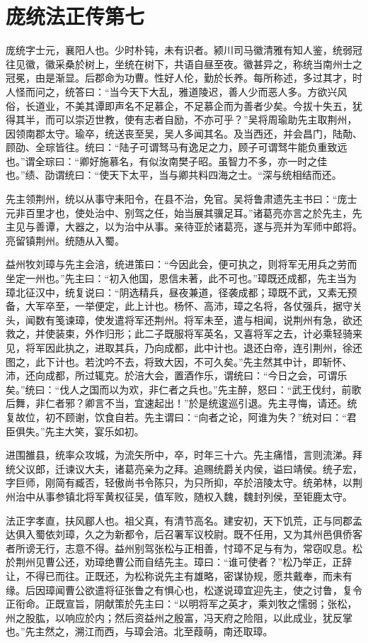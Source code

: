 \documentclass[12pt,UTF8]{ctexbook}
\begin{document}
\chapter{庞统法正传第七}

庞统字士元，襄阳人也。少时朴钝，未有识者。颍川司马徽清雅有知人鉴，统弱冠往见徽，徽采桑於树上，坐统在树下，共语自昼至夜。徽甚异之，称统当南州士之冠冕，由是渐显。后郡命为功曹。性好人伦，勤於长养。每所称述，多过其才，时人怪而问之，统答曰：“当今天下大乱，雅道陵迟，善人少而恶人多。方欲兴风俗，长道业，不美其谭即声名不足慕企，不足慕企而为善者少矣。今拔十失五，犹得其半，而可以崇迈世教，使有志者自励，不亦可乎？”吴将周瑜助先主取荆州，因领南郡太守。瑜卒，统送丧至吴，吴人多闻其名。及当西还，并会昌门，陆勣、顾劭、全琮皆往。统曰：“陆子可谓驽马有逸足之力，顾子可谓驽牛能负重致远也。”谓全琮曰：“卿好施慕名，有似汝南樊子昭。虽智力不多，亦一时之佳也。”绩、劭谓统曰：“使天下太平，当与卿共料四海之士。“深与统相结而还。

先主领荆州，统以从事守耒阳令，在县不治，免官。吴将鲁肃遗先主书曰：“庞士元非百里才也，使处治中、别驾之任，始当展其骥足耳。”诸葛亮亦言之於先主，先主见与善谭，大器之，以为治中从事。亲待亚於诸葛亮，遂与亮并为军师中郎将。亮留镇荆州。统随从入蜀。

益州牧刘璋与先主会涪，统进策曰：“今因此会，便可执之，则将军无用兵之劳而坐定一州也。”先主曰：“初入他国，恩信未著，此不可也。”璋既还成都，先主当为璋北征汉中，统复说曰：“阴选精兵，昼夜兼道，径袭成都；璋既不武，又素无预备，大军卒至，一举便定，此上计也。杨怀、高沛，璋之名将，各仗强兵，据守关头，闻数有笺谏璋，使发遣将军还荆州。将军未至，遣与相闻，说荆州有急，欲还救之，并使装束，外作归形；此二子既服将军英名，又喜将军之去，计必乘轻骑来见，将军因此执之，进取其兵，乃向成都，此中计也。退还白帝，连引荆州，徐还图之，此下计也。若沈吟不去，将致大因，不可久矣。”先主然其中计，即斩怀、沛，还向成都，所过辄克。於涪大会，置酒作乐，谓统曰：“今日之会，可谓乐矣。”统曰：“伐人之国而以为欢，非仁者之兵也。”先主醉，怒曰：“武王伐纣，前歌后舞，非仁者邪？卿言不当，宜速起出！”於是统逡巡引退。先主寻悔，请还。统复故位，初不顾谢，饮食自若。先主谓曰：“向者之论，阿谁为失？”统对曰：“君臣俱失。”先主大笑，宴乐如初。

进围雒县，统率众攻城，为流矢所中，卒，时年三十六。先主痛惜，言则流涕。拜统父议郎，迁谏议大夫，诸葛亮亲为之拜。追赐统爵关内侯，谥曰靖侯。统子宏，字巨师，刚简有臧否，轻傲尚书令陈只，为只所抑，卒於涪陵太守。统弟林，以荆州治中从事参镇北将军黄权征吴，值军败，随权入魏，魏封列侯，至钜鹿太守。

法正字孝直，扶风郿人也。祖父真，有清节高名。建安初，天下饥荒，正与同郡孟达俱入蜀依刘璋，久之为新都令，后召署军议校尉。既不任用，又为其州邑俱侨客者所谤无行，志意不得。益州别驾张松与正相善，忖璋不足与有为，常窃叹息。松於荆州见曹公还，劝璋绝曹公而自结先主。璋曰：“谁可使者？”松乃举正，正辞让，不得已而往。正既还，为松称说先主有雄略，密谋协规，愿共戴奉，而未有缘。后因璋闻曹公欲遣将征张鲁之有惧心也，松遂说璋宜迎先主，使之讨鲁，复令正衔命。正既宣旨，阴献策於先主曰：“以明将军之英才，乘刘牧之懦弱；张松，州之股肱，以响应於内；然后资益州之殷富，冯天府之险阻，以此成业，犹反掌也。”先主然之，溯江而西，与璋会涪。北至葭萌，南还取璋。
\end{document}
